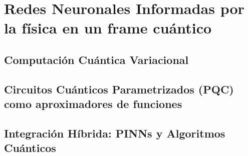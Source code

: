 \documentclass[../0000.tex]{subfiles}
\begin{document}

\chapter{Redes Neuronales Informadas por la física en un frame cuántico}\label{ch:quantum}
\section{Computación Cuántica Variacional}
\section{Circuitos Cuánticos Parametrizados (PQC) como aproximadores de funciones}
\section{Integración Híbrida: PINNs y Algoritmos Cuánticos}

\ifSubfilesClassLoaded{}{}
\end{document}
